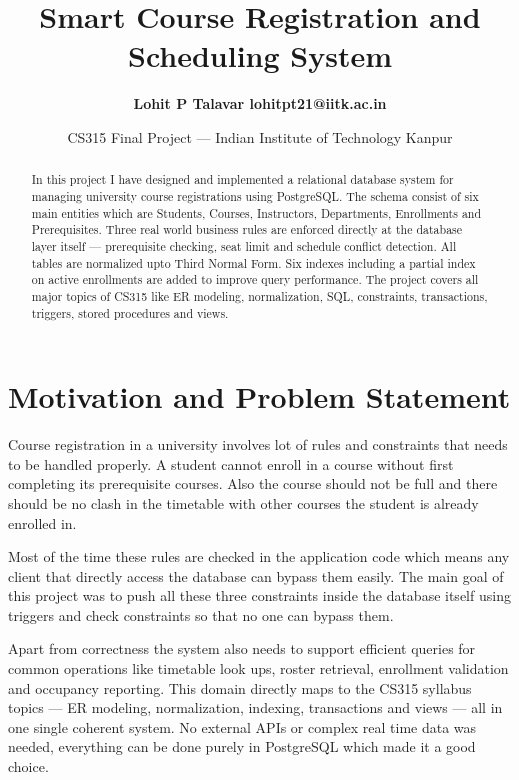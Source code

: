 \documentclass[11pt]{article}
\title{\bf Smart Course Registration and Scheduling System}
\author{
        \bf Lohit P Talavar \qquad 210564 \qquad lohitpt21@iitk.ac.in
    }
\date{CS315 Final Project --- Indian Institute of Technology Kanpur}
\begin{document}
    \maketitle

    \begin{abstract}
    In this project I have designed and implemented a relational database system
    for managing university course registrations using PostgreSQL. The schema consist
    of six main entities which are Students, Courses, Instructors, Departments,
    Enrollments and Prerequisites. Three real world business rules are enforced
    directly at the database layer itself — prerequisite checking, seat limit and
    schedule conflict detection. All tables are normalized upto Third Normal Form.
    Six indexes including a partial index on active enrollments are added to improve
    query performance. The project covers all major topics of CS315 like ER modeling,
    normalization, SQL, constraints, transactions, triggers, stored procedures and views.
    \end{abstract}

    \section{Motivation and Problem Statement}

    Course registration in a university involves lot of rules and constraints that
    needs to be handled properly. A student cannot enroll in a course without first
    completing its prerequisite courses. Also the course should not be full and there
    should be no clash in the timetable with other courses the student is already
    enrolled in.

    Most of the time these rules are checked in the application code which means
    any client that directly access the database can bypass them easily. The main
    goal of this project was to push all these three constraints inside the database
    itself using triggers and check constraints so that no one can bypass them.

    Apart from correctness the system also needs to support efficient queries for
    common operations like timetable look ups, roster retrieval, enrollment validation
    and occupancy reporting. This domain directly maps to the CS315 syllabus topics ---
    ER modeling, normalization, indexing, transactions and views --- all in one single
    coherent system. No external APIs or complex real time data was needed, everything
    can be done purely in PostgreSQL which made it a good choice.
\end{document}
